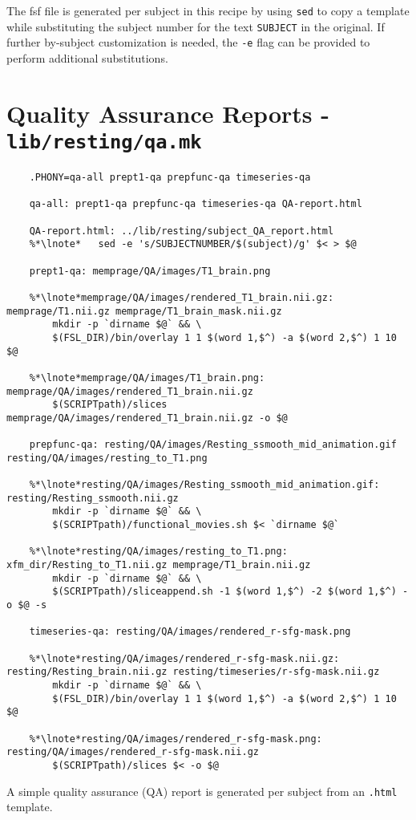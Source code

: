 The fsf file is generated per subject in this recipe by using \texttt{sed} to copy a template while substituting the subject number for the text \texttt{SUBJECT} in the original. If further by-subject customization is needed, the \texttt{-e} flag can be provided to perform additional substitutions.

\section{Quality Assurance Reports - \texttt{lib/resting/qa.mk}}
\begin{lstlisting}
	.PHONY=qa-all prept1-qa prepfunc-qa timeseries-qa
	
	qa-all: prept1-qa prepfunc-qa timeseries-qa QA-report.html
	
	QA-report.html: ../lib/resting/subject_QA_report.html
	%*\lnote*	sed -e 's/SUBJECTNUMBER/$(subject)/g' $< > $@
	
	prept1-qa: memprage/QA/images/T1_brain.png
	
	%*\lnote*memprage/QA/images/rendered_T1_brain.nii.gz: memprage/T1.nii.gz memprage/T1_brain_mask.nii.gz
		mkdir -p `dirname $@` && \
		$(FSL_DIR)/bin/overlay 1 1 $(word 1,$^) -a $(word 2,$^) 1 10 $@
	
	%*\lnote*memprage/QA/images/T1_brain.png: memprage/QA/images/rendered_T1_brain.nii.gz
		$(SCRIPTpath)/slices memprage/QA/images/rendered_T1_brain.nii.gz -o $@

	prepfunc-qa: resting/QA/images/Resting_ssmooth_mid_animation.gif resting/QA/images/resting_to_T1.png
	
	%*\lnote*resting/QA/images/Resting_ssmooth_mid_animation.gif: resting/Resting_ssmooth.nii.gz
		mkdir -p `dirname $@` && \
		$(SCRIPTpath)/functional_movies.sh $< `dirname $@`
	
	%*\lnote*resting/QA/images/resting_to_T1.png: xfm_dir/Resting_to_T1.nii.gz memprage/T1_brain.nii.gz
		mkdir -p `dirname $@` && \
		$(SCRIPTpath)/sliceappend.sh -1 $(word 1,$^) -2 $(word 1,$^) -o $@ -s
	
	timeseries-qa: resting/QA/images/rendered_r-sfg-mask.png
	
	%*\lnote*resting/QA/images/rendered_r-sfg-mask.nii.gz: resting/Resting_brain.nii.gz resting/timeseries/r-sfg-mask.nii.gz
		mkdir -p `dirname $@` && \
		$(FSL_DIR)/bin/overlay 1 1 $(word 1,$^) -a $(word 2,$^) 1 10 $@
	
	%*\lnote*resting/QA/images/rendered_r-sfg-mask.png: resting/QA/images/rendered_r-sfg-mask.nii.gz
		$(SCRIPTpath)/slices $< -o $@
\end{lstlisting}
A simple quality assurance (QA) report is generated per subject from an \texttt{.html} template.

